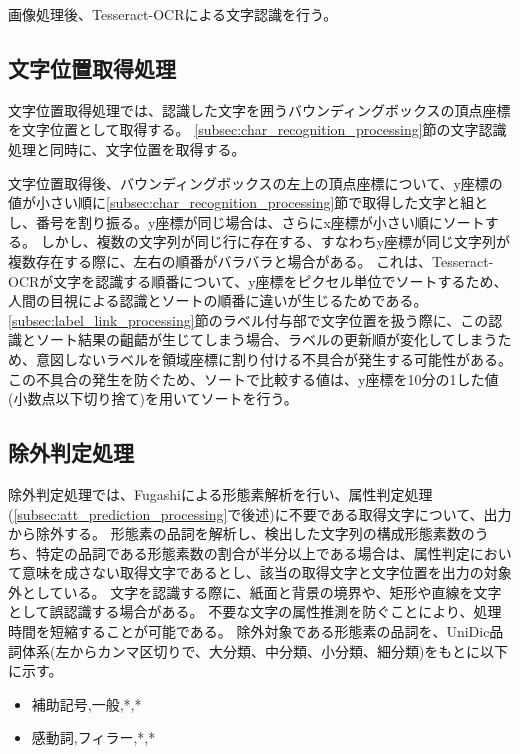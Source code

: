 画像処理後、Tesseract-OCRによる文字認識を行う。

\subsection{文字位置取得処理}\label{subsec:char_position_obtainment_processing}
文字位置取得処理では、認識した文字を囲うバウンディングボックスの頂点座標を文字位置として取得する。
\ref{subsec:char_recognition_processing}節の文字認識処理と同時に、文字位置を取得する。

文字位置取得後、バウンディングボックスの左上の頂点座標について、y座標の値が小さい順に\ref{subsec:char_recognition_processing}節で取得した文字と組とし、番号を割り振る。y座標が同じ場合は、さらにx座標が小さい順にソートする。
しかし、複数の文字列が同じ行に存在する、すなわちy座標が同じ文字列が複数存在する際に、左右の順番がバラバラと場合がある。
これは、Tesseract-OCRが文字を認識する順番について、y座標をピクセル単位でソートするため、人間の目視による認識とソートの順番に違いが生じるためである。
\ref{subsec:label_link_processing}節のラベル付与部で文字位置を扱う際に、この認識とソート結果の齟齬が生じてしまう場合、ラベルの更新順が変化してしまうため、意図しないラベルを領域座標に割り付ける不具合が発生する可能性がある。
この不具合の発生を防ぐため、ソートで比較する値は、y座標を10分の1した値(小数点以下切り捨て)を用いてソートを行う。


\subsection{除外判定処理}\label{subsec:exclusion_judgement_processing}
除外判定処理では、Fugashiによる形態素解析を行い、属性判定処理(\ref{subsec:att_prediction_processing}で後述)に不要である取得文字について、出力から除外する。
形態素の品詞を解析し、検出した文字列の構成形態素数のうち、特定の品詞である形態素数の割合が半分以上である場合は、属性判定において意味を成さない取得文字であるとし、該当の取得文字と文字位置を出力の対象外としている。
文字を認識する際に、紙面と背景の境界や、矩形や直線を文字として誤認識する場合がある。
不要な文字の属性推測を防ぐことにより、処理時間を短縮することが可能である。
除外対象である形態素の品詞を、UniDic品詞体系(左からカンマ区切りで、大分類、中分類、小分類、細分類)をもとに以下に示す。

\begin{itemize}
    \item 補助記号,一般,*,*
    \item 感動詞,フィラー,*,*
\end{itemize}


